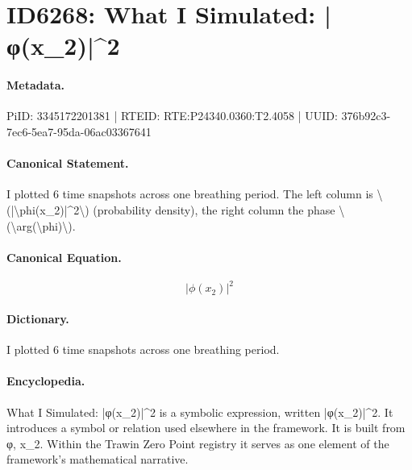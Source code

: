 \section*{ID6268: What I Simulated: |φ(x\_2)|\textasciicircum{}2}
\paragraph{Metadata.}
PiID: 3345172201381 | RTEID: RTE:P24340.0360:T2.4058 | UUID: 376b92c3-7ec6-5ea7-95da-06ac03367641

\paragraph{Canonical Statement.}
I plotted 6 time snapshots across one breathing period. The left column is \textbackslash{}(|\textbackslash{}phi(x\_2)|\textasciicircum{}2\textbackslash{}) (probability density), the right column the phase \textbackslash{}(\textbackslash{}arg(\textbackslash{}phi)\textbackslash{}).

\paragraph{Canonical Equation.}
\[
|\phi(x_2)|^2
\]

\paragraph{Dictionary.}
I plotted 6 time snapshots across one breathing period.

\paragraph{Encyclopedia.}
What I Simulated: |φ(x\_2)|\textasciicircum{}2 is a symbolic expression, written |φ(x\_2)|\textasciicircum{}2. It introduces a symbol or relation used elsewhere in the framework. It is built from φ, x\_2. Within the Trawin Zero Point registry it serves as one element of the framework's mathematical narrative.
